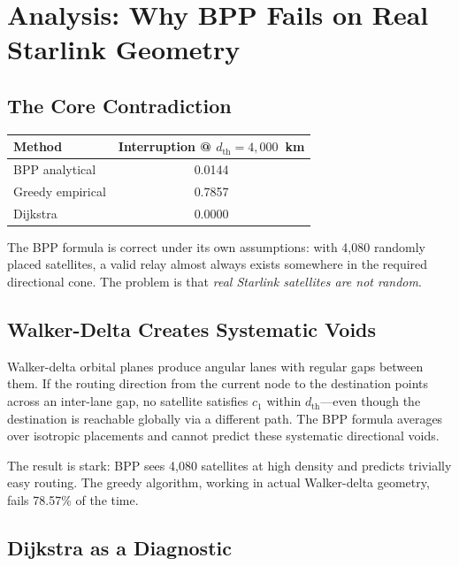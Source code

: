 \documentclass[12pt,a4paper]{report}
\newcommand{\dth}{d_{\mathrm{th}}}
\begin{document}
\chapter{Analysis: Why BPP Fails on Real Starlink Geometry}
\label{ch:analysis}

\section{The Core Contradiction}

\begin{center}
\begin{tabular}{lc}
\toprule
\textbf{Method} & \textbf{Interruption @ } $\dth=4{,}000$~\textbf{km} \\
\midrule
BPP analytical   & 0.0144 \\
Greedy empirical & 0.7857 \\
Dijkstra         & 0.0000 \\
\bottomrule
\end{tabular}
\end{center}

The BPP formula is correct under its own assumptions: with 4{,}080 randomly placed
satellites, a valid relay almost always exists somewhere in the required directional
cone. The problem is that \emph{real Starlink satellites are not random}.

\section{Walker-Delta Creates Systematic Voids}

Walker-delta orbital planes produce angular lanes with regular gaps between them. If
the routing direction from the current node to the destination points across an
inter-lane gap, no satellite satisfies $c_1$ within $\dth$---even though the
destination is reachable globally via a different path. The BPP formula averages over
isotropic placements and cannot predict these systematic directional voids.

The result is stark: BPP sees 4{,}080 satellites at high density and predicts trivially
easy routing. The greedy algorithm, working in actual Walker-delta geometry, fails
78.57\% of the time.

\section{Dijkstra as a Diagnostic}
\end{document}
